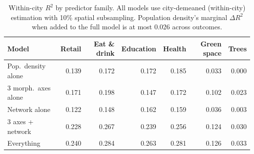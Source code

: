 \begin{table}[ht]
  \centering
  \caption{Within-city $R^2$ by predictor family. All models use city-demeaned
    (within-city) estimation with 10\% spatial subsampling. Population density's
    marginal $\Delta R^2$ when added to the full model is at most 0.026 across outcomes.}
  \label{tab:decomposition}
  \small
  \begin{tabular}{lrrrrrr}
    \toprule
    Model & Retail & Eat \& drink & Education & Health & Green space & Trees \\
    \midrule
    Pop.~density alone & 0.139 & 0.172 & 0.172 & 0.185 & 0.033 & 0.000 \\
    3 morph.~axes alone & 0.171 & 0.198 & 0.147 & 0.172 & 0.102 & 0.023 \\
    Network alone & 0.122 & 0.148 & 0.162 & 0.159 & 0.036 & 0.003 \\
    3 axes + network & 0.228 & 0.267 & 0.239 & 0.256 & 0.124 & 0.030 \\
    Everything & 0.240 & 0.284 & 0.263 & 0.281 & 0.126 & 0.033 \\
    \bottomrule
  \end{tabular}
\end{table}
